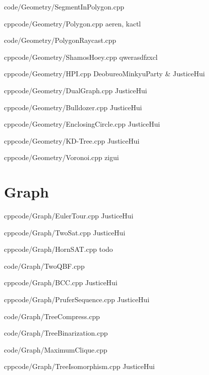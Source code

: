 \documentclass[landscape, 8pt, a4paper, oneside]{extarticle}
\begin{document}
\begin{multicols*}{3}
{code/Geometry/SegmentInPolygon.cpp}

{}{}
{cpp}{code/Geometry/Polygon.cpp}
{aeren, kactl}

{code/Geometry/PolygonRaycast.cpp}

{}{}
{cpp}{code/Geometry/ShamosHoey.cpp}
{qwerasdfzxcl}

{}{}
{cpp}{code/Geometry/HPI.cpp}
{DeobureoMinkyuParty & JusticeHui}

{}{}
{cpp}{code/Geometry/DualGraph.cpp}
{JusticeHui}

{}{}
{cpp}{code/Geometry/Bulldozer.cpp}
{JusticeHui}

{}{}
{cpp}{code/Geometry/EnclosingCircle.cpp}
{JusticeHui}

{}{}
{cpp}{code/Geometry/KD-Tree.cpp}
{JusticeHui}

{}{}
{cpp}{code/Geometry/Voronoi.cpp}
{zigui}

\section{Graph}

{}{}
{cpp}{code/Graph/EulerTour.cpp}
{JusticeHui}

{}{}
{cpp}{code/Graph/TwoSat.cpp}
{JusticeHui}

{}{}
{cpp}{code/Graph/HornSAT.cpp}
{todo}

{code/Graph/TwoQBF.cpp}

{}{}
{cpp}{code/Graph/BCC.cpp}
{JusticeHui}

{}{}
{cpp}{code/Graph/PruferSequence.cpp}
{JusticeHui}

{code/Graph/TreeCompress.cpp}

{code/Graph/TreeBinarization.cpp}

{code/Graph/MaximumClique.cpp}

{}{}
{cpp}{code/Graph/TreeIsomorphism.cpp}
{JusticeHui}


\end{multicols*}
\end{document}
